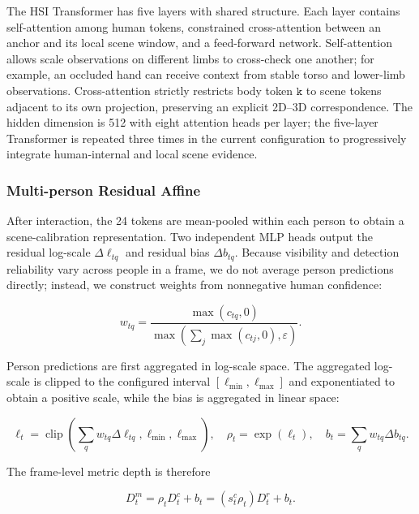 \documentclass{article}
\begin{document}
The HSI Transformer has five layers with shared structure. Each layer contains self-attention among human tokens, constrained cross-attention between an anchor and its local scene window, and a feed-forward network. Self-attention allows scale observations on different limbs to cross-check one another; for example, an occluded hand can receive context from stable torso and lower-limb observations. Cross-attention strictly restricts body token $\texttt{k}$ to scene tokens adjacent to its own projection, preserving an explicit 2D--3D correspondence. The hidden dimension is 512 with eight attention heads per layer; the five-layer Transformer is repeated three times in the current configuration to progressively integrate human-internal and local scene evidence.

\subsubsection{Multi-person Residual Affine}

After interaction, the 24 tokens are mean-pooled within each person to obtain a scene-calibration representation. Two independent MLP heads output the residual log-scale $\Delta\ell_{tq}$ and residual bias $\Delta b_{tq}$. Because visibility and detection reliability vary across people in a frame, we do not average person predictions directly; instead, we construct weights from nonnegative human confidence:

\begin{equation}
w_{tq}=
\frac{\max(c_{tq},0)}
{\max\!\left(\sum_j\max(c_{tj},0),\varepsilon\right)}.
\label{eq:person-confidence}
\end{equation}

Person predictions are first aggregated in log-scale space. The aggregated log-scale is clipped to the configured interval $[\ell_{\min},\ell_{\max}]$ and exponentiated to obtain a positive scale, while the bias is aggregated in linear space:

\begin{equation}
\ell_t=\operatorname{clip}\!\left(
\sum_q w_{tq}\Delta\ell_{tq},\ell_{\min},\ell_{\max}\right),
\quad \rho_t=\exp(\ell_t),
\quad b_t=\sum_qw_{tq}\Delta b_{tq}.
\label{eq:residual-affine}
\end{equation}

The frame-level metric depth is therefore

\begin{equation}
D_t^m=\rho_tD_t^c+b_t=(s_t^c\rho_t)D_t^r+b_t.
\label{eq:metric-depth}
\end{equation}
\end{document}
